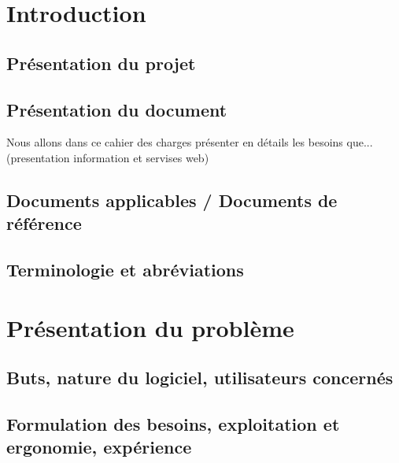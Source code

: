 \section{Introduction}

\subsection{Présentation du projet}


\subsection{Présentation du document}

Nous allons dans ce cahier des charges présenter en détails les besoins que... (presentation information et servises web)

\subsection{Documents applicables / Documents de référence}


\subsection{Terminologie et abréviations}


\section{Présentation du problème}

\subsection{Buts, nature du logiciel, utilisateurs concernés}



\subsection{Formulation des besoins, exploitation et ergonomie, expérience}



